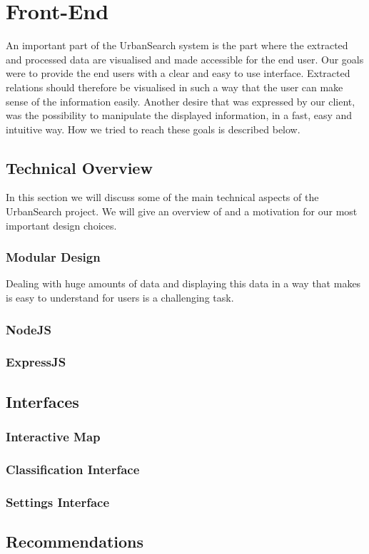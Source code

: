 \section{Front-End}
An important part of the UrbanSearch system is the part where the extracted and processed data are visualised and made accessible for the end user. Our goals were to provide the end users with a clear and easy to use interface. Extracted relations should therefore be visualised in such a way that the user can make sense of the information easily. Another desire that was expressed by our client, was the possibility to manipulate the displayed information, in a fast, easy and intuitive way. How we tried to reach these goals is described below.

\subsection{Technical Overview}
In this section we will discuss some of the main technical aspects of the UrbanSearch project. We will give an overview of and a motivation for our most important design choices.

\subsubsection{Modular Design}
Dealing with huge amounts of data and displaying this data in a way that makes is easy to understand for users is a challenging task. 
\subsubsection{NodeJS}
\subsubsection{ExpressJS}


\subsection{Interfaces}
\subsubsection{Interactive Map}
\subsubsection{Classification Interface}
\subsubsection{Settings Interface}

\subsection{Recommendations}